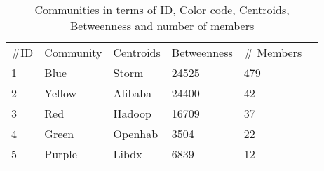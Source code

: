 
\begin{table}[]
\centering
\caption{Communities in terms of ID, Color code, Centroids, Betweenness and number of members}
\label{tab:communities}
\begin{tabular}{llllll}
\#ID               & Community             & Centroids        & Betweenness & \# Members        \\
1                  & Blue                  & Storm &           24525 &    479                                      \\
2                  & Yellow                & Alibaba          & 24400      & 42                                      \\
3                  & Red                   & Hadoop           & 16709      & 37                                      \\
4                  & Green                 & Openhab          & 3504       & 22                                      \\
5                  & Purple                & Libdx              & 6839       & 12                                     
\end{tabular}
\end{table}
